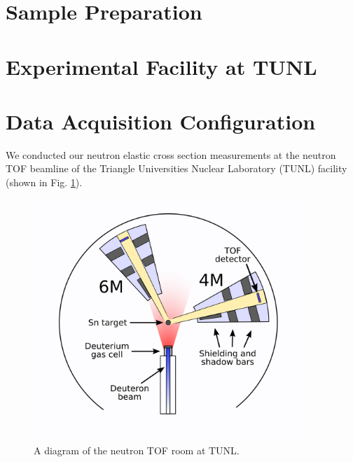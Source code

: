 \section{Sample Preparation}
\section{Experimental Facility at TUNL}
\section{Data Acquisition Configuration}

We conducted our neutron elastic cross section measurements at the neutron TOF
beamline of the Triangle Universities Nuclear Laboratory (TUNL) facility
(shown in Fig. \ref{ExperimentalSetupTUNL}).

\begin{figure}
  \begin{center}
\includegraphics[width = 0.9\textwidth]{figures/ExperimentalSetupTUNL.png}
\caption{A diagram of the neutron TOF room at TUNL.} 
\label{ExperimentalSetupTUNL}
\end{center}
\end{figure}

